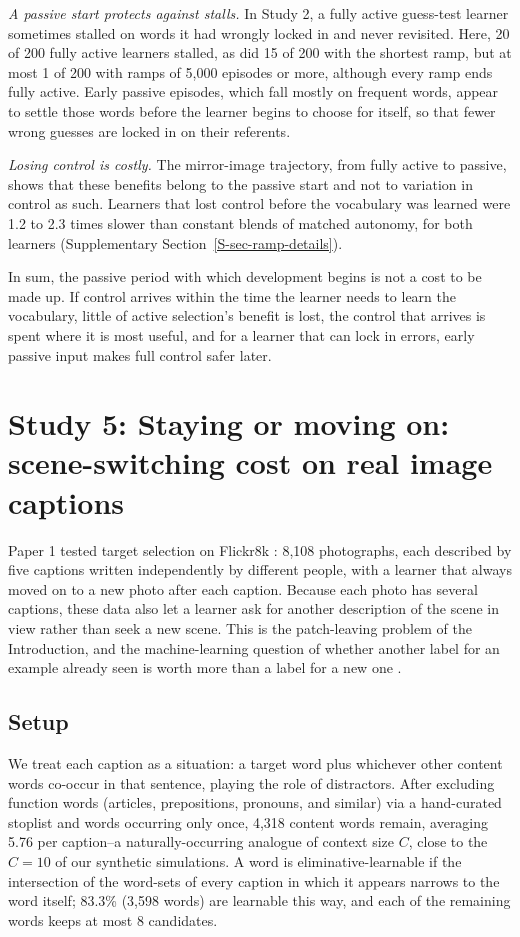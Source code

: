 \documentclass[a4paper,natbib,man]{apa6}
\begin{document}
\textit{A passive start protects against stalls.} In Study 2, a fully active guess-test learner sometimes stalled on words it had wrongly locked in and never revisited. Here, 20 of 200 fully active learners stalled, as did 15 of 200 with the shortest ramp, but at most 1 of 200 with ramps of 5,000 episodes or more, although every ramp ends fully active. Early passive episodes, which fall mostly on frequent words, appear to settle those words before the learner begins to choose for itself, so that fewer wrong guesses are locked in on their referents.

\textit{Losing control is costly.} The mirror-image trajectory, from fully active to passive, shows that these benefits belong to the passive start and not to variation in control as such. Learners that lost control before the vocabulary was learned were 1.2 to 2.3 times slower than constant blends of matched autonomy, for both learners (Supplementary Section~\ref{S-sec-ramp-details}).

In sum, the passive period with which development begins is not a cost to be made up. If control arrives within the time the learner needs to learn the vocabulary, little of active selection's benefit is lost, the control that arrives is spent where it is most useful, and for a learner that can lock in errors, early passive input makes full control safer later.

\section{Study 5: Staying or moving on: scene-switching cost on real image captions}
\label{sec-flickr}

Paper 1 tested target selection on Flickr8k \citep{Hodosh:2013}: 8,108 photographs, each described by five captions written independently by different people, with a learner that always moved on to a new photo after each caption. Because each photo has several captions, these data also let a learner ask for another description of the scene in view rather than seek a new scene. This is the patch-leaving problem of the Introduction, and the machine-learning question of whether another label for an example already seen is worth more than a label for a new one \citep{Sheng:2008}.

\subsection{Setup}
We treat each caption as a situation: a target word plus whichever other content words co-occur in that sentence, playing the role of distractors. After excluding function words (articles, prepositions, pronouns, and similar) via a hand-curated stoplist and words occurring only once, 4,318 content words remain, averaging 5.76 per caption--a naturally-occurring analogue of context size $C$, close to the $C=10$ of our synthetic simulations. A word is eliminative-learnable if the intersection of the word-sets of every caption in which it appears narrows to the word itself; 83.3\% (3,598 words) are learnable this way, and each of the remaining words keeps at most 8 candidates.
\end{document}
